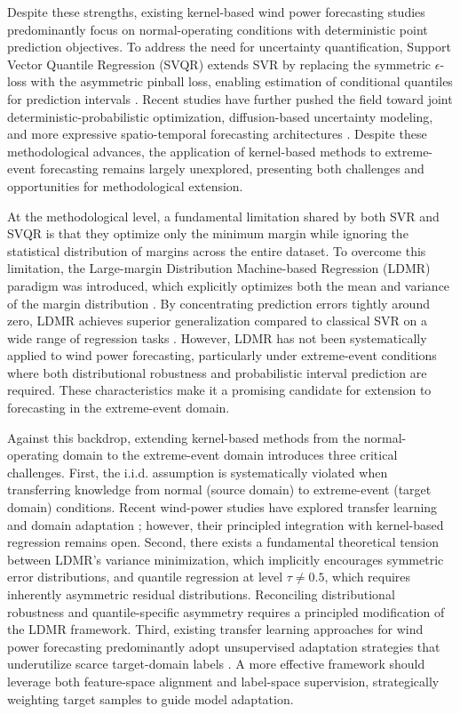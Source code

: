 \documentclass[a4paper]{cas-sc}
\begin{document}
Despite these strengths, existing kernel-based wind power forecasting studies predominantly focus on normal-operating conditions with deterministic point prediction objectives. To address the need for uncertainty quantification, Support Vector Quantile Regression (SVQR) extends SVR by replacing the symmetric $\epsilon$-loss with the asymmetric pinball loss, enabling estimation of conditional quantiles for prediction intervals \citep{ye2025nfs, tsvqr2023}. Recent studies have further pushed the field toward joint deterministic-probabilistic optimization, diffusion-based uncertainty modeling, and more expressive spatio-temporal forecasting architectures \citep{wang2025ensemble, liu2025diffusion, zhang2026gwsstnet}. Despite these methodological advances, the application of kernel-based methods to extreme-event forecasting remains largely unexplored, presenting both challenges and opportunities for methodological extension.

At the methodological level, a fundamental limitation shared by both SVR and SVQR is that they optimize only the minimum margin while ignoring the statistical distribution of margins across the entire dataset. To overcome this limitation, the Large-margin Distribution Machine-based Regression (LDMR) paradigm was introduced, which explicitly optimizes both the mean and variance of the margin distribution \citep{zhang2019optimal, gupta2021least}. By concentrating prediction errors tightly around zero, LDMR achieves superior generalization compared to classical SVR on a wide range of regression tasks \citep{gupta2021least, hazarika2023mode}. However, LDMR has not been systematically applied to wind power forecasting, particularly under extreme-event conditions where both distributional robustness and probabilistic interval prediction are required. These characteristics make it a promising candidate for extension to forecasting in the extreme-event domain.

Against this backdrop, extending kernel-based methods from the normal-operating domain to the extreme-event domain introduces three critical challenges. First, the i.i.d. assumption is systematically violated when transferring knowledge from normal (source domain) to extreme-event (target domain) conditions. Recent wind-power studies have explored transfer learning and domain adaptation \citep{yin2021serioparallel, wang2024scarcity, dong2023mdan}; however, their principled integration with kernel-based regression remains open. Second, there exists a fundamental theoretical tension between LDMR's variance minimization, which implicitly encourages symmetric error distributions, and quantile regression at level $\tau \neq 0.5$, which requires inherently asymmetric residual distributions. Reconciling distributional robustness and quantile-specific asymmetry requires a principled modification of the LDMR framework. Third, existing transfer learning approaches for wind power forecasting predominantly adopt unsupervised adaptation strategies that underutilize scarce target-domain labels \citep{yin2021serioparallel, wang2024scarcity, dong2023mdan}. A more effective framework should leverage both feature-space alignment and label-space supervision, strategically weighting target samples to guide model adaptation.
\end{document}
